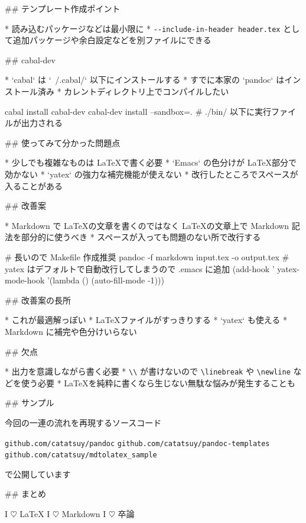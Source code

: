 ## テンプレート作成ポイント

* 読み込むパッケージなどは最小限に
* \verb+--include-in-header header.tex+ として追加パッケージや余白設定などを別ファイルにできる


## cabal-dev

* `cabal` は `~/.cabal/` 以下にインストールする
* すでに本家の `pandoc` はインストール済み
* カレントディレクトリ上でコンパイルしたい

\small

    cabal install cabal-dev
    cabal-dev install --sandbox=.
    # ./bin/ 以下に実行ファイルが出力される


## 使ってみて分かった問題点

* 少しでも複雑なものは \LaTeX で書く必要
* `Emacs` の色分けが \LaTeX 部分で効かない
* `yatex` の強力な補完機能が使えない
* 改行したところでスペースが入ることがある


## 改善案

* Markdown で \LaTeX の文章を書くのではなく \LaTeX の文章上で Markdown 記法を部分的に使うべき
* スペースが入っても問題のない所で改行する

\small

    # 長いので Makefile 作成推奨
    pandoc -f markdown input.tex -o output.tex
    # yatex はデフォルトで自動改行してしまうので .emacs に追加
    (add-hook ' yatex-mode-hook '(lambda ()
                               (auto-fill-mode -1)))


## 改善案の長所

* これが最適解っぽい
* \LaTeX ファイルがすっきりする
* `yatex` も使える
* Markdown に補完や色分けいらない

## 欠点

* 出力を意識しながら書く必要
* \verb+\\+ が書けないので \verb+\linebreak+ や \verb+\newline+ などを使う必要
* \LaTeX を純粋に書くなら生じない無駄な悩みが発生することも


## サンプル

\begin{center}
今回の一連の流れを再現するソースコード

\verb+github.com/catatsuy/pandoc+  
\verb+github.com/catatsuy/pandoc-templates+  
\verb+github.com/catatsuy/mdtolatex_sample+

 で公開しています

\end{center}


## まとめ

\vspace{-25pt}
\begin{center}
 \Huge
 I $\heartsuit$ \LaTeX \linebreak
 I $\heartsuit$ Markdown \linebreak
 I $\heartsuit$ 卒論
\end{center}
